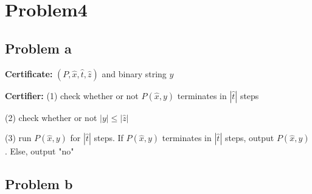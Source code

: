 \documentclass[openany]{article}
\begin{document}
\section*{Problem4}
\subsection*{Problem a}

\textbf{Certificate:} $(P, \hat{x}, \hat{t}, \hat{z})$ and binary string $y$

\textbf{Certifier:} 
(1) check whether or not $P(\hat{x},y)$ terminates in $|\hat{t}|$ steps

(2) check whether or not $|y| \leqslant |\hat{z}|$

(3) run $P(\hat{x},y)$ for $|\hat{t}|$ steps. If $P(\hat{x},y)$ terminates in $|\hat{t}|$ steps, output $P(\hat{x},y)$. Else, output "no"

\subsection*{Problem b}
\end{document}
